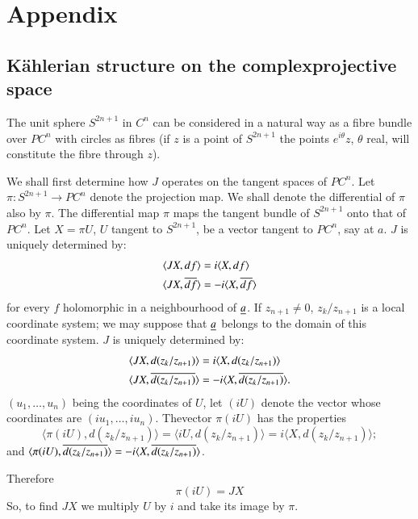 \chapter{Appendix}

\section*{K\"ahlerian structure on the complex\protect\hfil\protect\break projective
  space}\pageoriginale

The unit sphere $S^{2n+1}$ in $C^{n}$ can be considered in a natural
way as a fibre bundle over $PC^{n}$ with circles as fibres (if $z$ is
a point of $S^{2n+1}$ the points $e^{i\theta}{z}$, $\theta$ real,
will constitute the fibre through $z$).

We shall first determine how $J$ operates on the tangent spaces of
$PC^{n}$. Let $\pi:S^{2n+1}\to PC^{n}$ denote the projection map. We
shall denote the differential of $\pi$ also by $\pi$. The differential
map $\pi$ maps the tangent bundle of $S^{2n+1}$ onto that of
$PC^{n}$. Let $X=\pi U$, $U$ tangent to $S^{2n+1}$, be a vector
tangent to $PC^{n}$, say at $a$. $J$ is uniquely determined by:
\begin{align*}
\langle JX, df\rangle &= i\langle X,df\rangle\\
\langle JX, \overline{df}\rangle &=-i \langle X,\overline{df}\rangle
\end{align*}
for every $f$ holomorphic in a neighbourhood of $\underline{a}$. If
$z_{n+1}\neq 0$, $z_{k}/z_{n+1}$ is a local coordinate system; we may
suppose that $\underline{a}$ belongs to the domain of this coordinate
system. $J$ is uniquely determined by:
\begin{align*}
\langle JX, d(z_{k}/z_{n+1})\rangle &=i \langle
X,d(z_{k}/z_{n+1})\rangle\\
\langle JX, \overline{d(z_{k}/z_{n+1})}\rangle &=-i\langle X,
\overline{d(z_{k}/z_{n+1})}\rangle. 
\end{align*}
$(u_{1},\ldots,u_{n})$ being the coordinates of $U$, let $(iU)$ denote
the vector whose coordinates are
$(iu_{1},\ldots,iu_{n})$. The\pageoriginale vector $\pi(iU)$ has the
properties
$$
\langle \pi (iU),d(z_{k}/z_{n+1})\rangle =\langle iU,
d(z_{k}/z_{n+1})\rangle =i\langle X,d(z_{k}/z_{n+1})\rangle;
$$
and $\langle\pi(iU),\overline{d(z_{k}/z_{n+1})}\rangle=-i\langle
X,\overline{d(z_{k}/z_{n+1})}\rangle$.

Therefore
$$
\pi(iU)=JX
$$
So, to find $JX$ we multiply $U$ by $i$ and take its image by $\pi$. 

